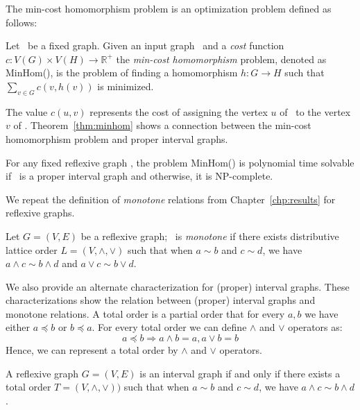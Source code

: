 The min-cost homomorphism problem is an optimization problem defined as follows:

\begin{defi} [MinHom]
Let \mH\ be a fixed graph. Given an input graph \mG\ and a \emph{cost} function
\(c: V(G) \times V(H) \to \mathbb{R}^+\) the \emph{min-cost homomorphism} problem,
denoted as MinHom(\mH), is the problem of finding a homomorphism 
\(h:G\to H\) such that \(\sum_{v\in G} c(v, h(v))\) is minimized.
\end{defi}

The value \(c(u,v)\) represents the cost of assigning the vertex \(u\) of \mG\ to the vertex \(v\) of \mH\@.
Theorem~\ref{thm:minhom} shows a connection between the min-cost homomorphism problem 
and proper interval graphs.

\begin{theorem}  \label{thm:minhom}
For any fixed reflexive graph \mH, the problem MinHom(\mH) is polynomial time solvable if
\mH\ is a proper interval graph and otherwise, it is NP-complete.
\end{theorem}

We repeat the definition of \emph{monotone} relations from Chapter~\ref{chp:results}
for reflexive graphs.

\begin{defi} 
Let \(G=(V,E)\) be a reflexive graph; \mG\ is \emph{monotone} if there exists distributive lattice order
\(L=(V, \wedge, \vee)\) such that
when \(a\sim b\) and \(c \sim d\), we have \(a \wedge c \sim b \wedge d\) and \(a \vee c \sim b \vee d\)\@.
\end{defi}

We also provide an alternate characterization for (proper) interval graphs.
These characterizations show the relation between (proper) interval graphs and monotone relations. 
A total order is a partial order that for every \(a, b\) we have either \(a \preceq b\)
or \(b \preceq a\)\@. For every total order we can define \(\wedge\) and \(\vee\) operators as:
\[a \preceq b \Rightarrow a \wedge b = a, a \vee b = b\]
Hence, we can represent a total order by \(\wedge\) and \(\vee\) operators.

\begin{theorem}[TODO] \label{thm:semimin}
A reflexive graph \(G=(V,E)\) is an interval graph if and only if there exists
a total order \(T=(V,\wedge,\vee))\) such that
when \(a\sim b\) and \(c \sim d\), we have \(a \wedge c \sim b \wedge d\)\@.
\end{theorem}

